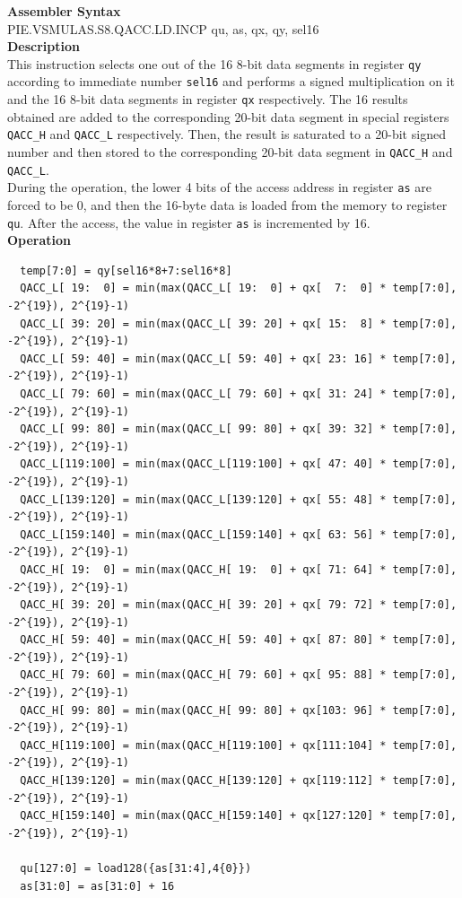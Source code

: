 \textbf{Assembler Syntax} \\
PIE.VSMULAS.S8.QACC.LD.INCP qu, as, qx, qy, sel16 \\
\textbf{Description} \\
This instruction selects one out of the 16 8-bit data segments in register \lstinline{qy} according to immediate number \lstinline{sel16} and performs a signed multiplication on it and the 16 8-bit data segments in register \lstinline{qx} respectively. The 16 results obtained are added to the corresponding 20-bit data segment in special registers \lstinline{QACC_H} and \lstinline{QACC_L} respectively. Then, the result is saturated to a 20-bit signed number and then stored to the corresponding 20-bit data segment in \lstinline{QACC_H} and \lstinline{QACC_L}.\\
During the operation, the lower 4 bits of the access address in register \lstinline{as} are forced to be 0, and then the 16-byte data is loaded from the memory to register \lstinline{qu}. After the access, the value in register \lstinline{as} is incremented by 16.\\
\textbf{Operation}
\begin{lstlisting}
  temp[7:0] = qy[sel16*8+7:sel16*8]
  QACC_L[ 19:  0] = min(max(QACC_L[ 19:  0] + qx[  7:  0] * temp[7:0], -2^{19}), 2^{19}-1)
  QACC_L[ 39: 20] = min(max(QACC_L[ 39: 20] + qx[ 15:  8] * temp[7:0], -2^{19}), 2^{19}-1)
  QACC_L[ 59: 40] = min(max(QACC_L[ 59: 40] + qx[ 23: 16] * temp[7:0], -2^{19}), 2^{19}-1)
  QACC_L[ 79: 60] = min(max(QACC_L[ 79: 60] + qx[ 31: 24] * temp[7:0], -2^{19}), 2^{19}-1)
  QACC_L[ 99: 80] = min(max(QACC_L[ 99: 80] + qx[ 39: 32] * temp[7:0], -2^{19}), 2^{19}-1)
  QACC_L[119:100] = min(max(QACC_L[119:100] + qx[ 47: 40] * temp[7:0], -2^{19}), 2^{19}-1)
  QACC_L[139:120] = min(max(QACC_L[139:120] + qx[ 55: 48] * temp[7:0], -2^{19}), 2^{19}-1)
  QACC_L[159:140] = min(max(QACC_L[159:140] + qx[ 63: 56] * temp[7:0], -2^{19}), 2^{19}-1)
  QACC_H[ 19:  0] = min(max(QACC_H[ 19:  0] + qx[ 71: 64] * temp[7:0], -2^{19}), 2^{19}-1)
  QACC_H[ 39: 20] = min(max(QACC_H[ 39: 20] + qx[ 79: 72] * temp[7:0], -2^{19}), 2^{19}-1)
  QACC_H[ 59: 40] = min(max(QACC_H[ 59: 40] + qx[ 87: 80] * temp[7:0], -2^{19}), 2^{19}-1)
  QACC_H[ 79: 60] = min(max(QACC_H[ 79: 60] + qx[ 95: 88] * temp[7:0], -2^{19}), 2^{19}-1)
  QACC_H[ 99: 80] = min(max(QACC_H[ 99: 80] + qx[103: 96] * temp[7:0], -2^{19}), 2^{19}-1)
  QACC_H[119:100] = min(max(QACC_H[119:100] + qx[111:104] * temp[7:0], -2^{19}), 2^{19}-1)
  QACC_H[139:120] = min(max(QACC_H[139:120] + qx[119:112] * temp[7:0], -2^{19}), 2^{19}-1)
  QACC_H[159:140] = min(max(QACC_H[159:140] + qx[127:120] * temp[7:0], -2^{19}), 2^{19}-1)

  qu[127:0] = load128({as[31:4],4{0}})
  as[31:0] = as[31:0] + 16
\end{lstlisting}

